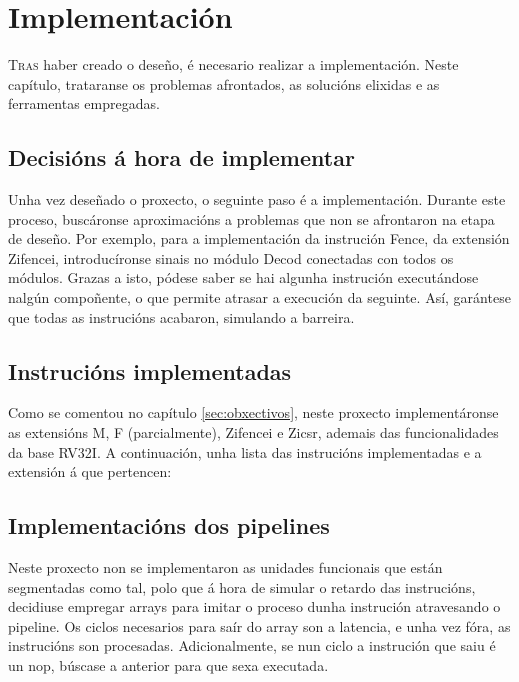 \chapter{Implementación}
\label{chap:implementacion}

\lettrine{T}{ras} haber creado o deseño, é necesario realizar a implementación. Neste capítulo, trataranse os problemas afrontados, as solucións elixidas e as ferramentas empregadas.

\section{Decisións á hora de implementar}\label{sec:decisions}
Unha vez deseñado o proxecto, o seguinte paso é a implementación. Durante este proceso, buscáronse aproximacións a problemas que non se afrontaron na etapa de deseño. Por exemplo, para a implementación da instrución Fence, da extensión Zifencei, introducíronse sinais no módulo Decod conectadas con todos os módulos. Grazas a isto, pódese saber se hai algunha instrución executándose nalgún compoñente, o que permite atrasar a execución da seguinte. Así, garántese que todas as instrucións acabaron, simulando a barreira.


\section{Instrucións implementadas}\label{sec:intrucions_implt}
Como se comentou no capítulo \ref{sec:obxectivos}, neste proxecto implementáronse as extensións M, F (parcialmente), Zifencei e Zicsr, ademais das funcionalidades da base RV32I. A continuación, unha lista das instrucións implementadas e a extensión á que pertencen:



\section{Implementacións dos pipelines}\label{sec:implt_pipelines}
Neste proxecto non se implementaron as unidades funcionais que están segmentadas como tal, polo que á hora de simular o retardo das instrucións, decidiuse empregar arrays para imitar o proceso dunha instrución atravesando o pipeline. Os ciclos necesarios para saír do array son a latencia, e unha vez fóra, as instrucións son procesadas. Adicionalmente, se nun ciclo a instrución que saiu é un \acrfull{nop}, búscase a anterior para que sexa executada. 


